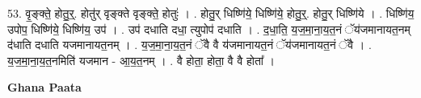 \documentclass[17pt]{extarticle}
\begin{document}
53. वृ॒ङ्क्ते॒ होतु॒र्॒. होतु॑र् वृङ्क्ते वृङ्क्ते॒ होतुः॑ । . होतु॒र् धिष्णि॑ये॒ धिष्णि॑ये॒ होतु॒र्॒. होतु॒र् धिष्णि॑ये । . धिष्णि॑य॒ उपोप॒ धिष्णि॑ये॒ धिष्णि॑य॒ उप॑ । . उप॑ दधाति दधा॒ त्युपोप॑ दधाति । . द॒धा॒ति॒ य॒ज॒मा॒ना॒य॒त॒नं ॅय॑जमानायत॒नम् द॑धाति दधाति यजमानायत॒नम् । . य॒ज॒मा॒ना॒य॒त॒नं ॅवै वै य॑जमानायत॒नं ॅय॑जमानायत॒नं ॅवै । . य॒ज॒मा॒ना॒य॒त॒नमिति॑ यजमान - आ॒य॒त॒नम् । . वै होता॒ होता॒ वै वै होता᳚ । \newline

\textbf{Ghana Paata } \newline
\end{document}
